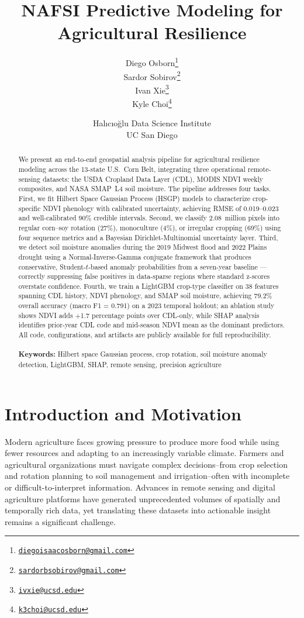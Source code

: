 \documentclass{article}
\title{NAFSI Predictive Modeling for Agricultural Resilience}
\author{
Diego Osborn\thanks{\texttt{\href{diegoisaacosborn@gmail.com}{diegoisaacosborn@gmail.com}}} \\
\And
Sardor Sobirov\thanks{\texttt{\href{sardorbsobirov@gmail.com}{sardorbsobirov@gmail.com}}} \\
\And
Ivan Xie\thanks{\texttt{\href{ivxie@ucsd.edu}{ivxie@ucsd.edu}}} \\
\And
Kyle Choi\thanks{
\texttt{\href{k3choi@ucsd.edu}{k3choi@ucsd.edu}}}\\
\and
Halıcıoğlu Data Science Institute\\
UC San Diego\\
}
\begin{document}
\maketitle

\begin{abstract}
We present an end-to-end geospatial analysis pipeline for agricultural
resilience modeling across the 13-state U.S.\ Corn Belt, integrating three
operational remote-sensing datasets: the USDA Cropland Data Layer (CDL),
MODIS NDVI weekly composites, and NASA SMAP~L4 soil moisture.
The pipeline addresses four tasks.
First, we fit Hilbert Space Gaussian Process (HSGP) models to
characterize crop-specific NDVI phenology with calibrated uncertainty,
achieving RMSE of 0.019--0.023 and well-calibrated 90\% credible intervals.
Second, we classify 2.08~million pixels into regular corn--soy rotation
(27\%), monoculture (4\%), or irregular cropping (69\%) using four
sequence metrics and a Bayesian Dirichlet-Multinomial uncertainty layer.
Third, we detect soil moisture anomalies during the 2019 Midwest flood and
2022 Plains drought using a Normal-Inverse-Gamma conjugate framework that
produces conservative, Student-$t$-based anomaly probabilities from a
seven-year baseline --- correctly suppressing false positives in
data-sparse regions where standard z-scores overstate confidence.
Fourth, we train a LightGBM crop-type classifier on 38 features spanning
CDL history, NDVI phenology, and SMAP soil moisture, achieving 79.2\%
overall accuracy (macro F1 = 0.791) on a 2023 temporal holdout; an
ablation study shows NDVI adds $+$1.7 percentage points over CDL-only,
while SHAP analysis identifies prior-year CDL code and mid-season NDVI
mean as the dominant predictors.
All code, configurations, and artifacts are publicly available for full
reproducibility.\\\\
\textbf{Keywords:} Hilbert space Gaussian process, crop rotation,
soil moisture anomaly detection, LightGBM, SHAP, remote sensing,
precision agriculture
\end{abstract}

\section{Introduction and Motivation}
\label{sec:intro}
Modern agriculture faces growing pressure to produce more food while using fewer resources and adapting to an increasingly variable climate. Farmers and agricultural organizations must navigate complex decisions--from crop selection and rotation planning to soil management and irrigation--often with incomplete or difficult-to-interpret information. Advances in remote sensing and digital agriculture platforms have generated unprecedented volumes of spatially and temporally rich data, yet translating these datasets into actionable insight remains a significant challenge.
\end{document}
